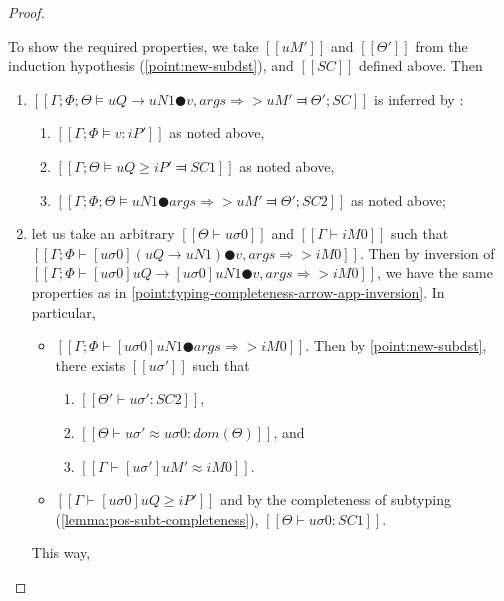 \begin{proof}
\begin{caseof}
            To show the required properties, we take
            $[[uM']]$ and $[[Θ']]$ from the induction hypothesis (\ref{point:new-subdst}), 
            and $[[SC]]$ defined above. Then
            \begin{enumerate}
                \item $[[ Γ; Φ; Θ ⊨ uQ → uN1 ● v,args ⇒> uM' ⫤ Θ'; SC ]]$
                    is inferred by :
                    \begin{enumerate}
                        \item $[[Γ; Φ ⊨ v : iP']]$ as noted above,
                        \item $[[Γ; Θ ⊨ uQ ≥ iP' ⫤ SC1]]$ as noted above,
                        \item $[[Γ; Φ; Θ ⊨ uN1 ● args ⇒> uM' ⫤ Θ'; SC2]]$ as noted above;
                    \end{enumerate}
                \item let us take an arbitrary $[[Θ ⊢ uσ0]]$ and $[[Γ ⊢ iM0]]$
                    such that $[[Γ; Φ ⊢ [uσ0](uQ → uN1) ● v,args ⇒> iM0]]$.
                    Then by inversion
                    of $[[Γ; Φ ⊢ [uσ0]uQ → [uσ0]uN1 ● v,args ⇒> iM0]]$,
                    we have the same properties as in 
                    \ref{point:typing-completeness-arrow-app-inversion}.
                    In particular,
                    \begin{itemize}
                        \item $[[Γ; Φ ⊢ [uσ0]uN1 ● args ⇒> iM0]]$. 
                            Then by \ref{point:new-subdst}, there exists $[[uσ']]$ such that 
                            \begin{enumerate}
                                \item $[[Θ' ⊢ uσ' : SC2]]$,
                                \item $[[Θ ⊢ uσ' ≈ uσ0 : dom(Θ)]]$, and 
                                \item $[[Γ ⊢ [uσ']uM' ≈ iM0]]$.
                            \end{enumerate}
                        \item $[[Γ ⊢ [uσ0]uQ ≥ iP']]$
                            and by the completeness of subtyping 
                            (\cref{lemma:pos-subt-completeness}),
                            $[[ Θ ⊢ uσ0 : SC1 ]]$.
                    \end{itemize}
                    This way,
                    \begin{itemize}

\end{itemize}
\end{enumerate}
\end{caseof}
\end{proof}
